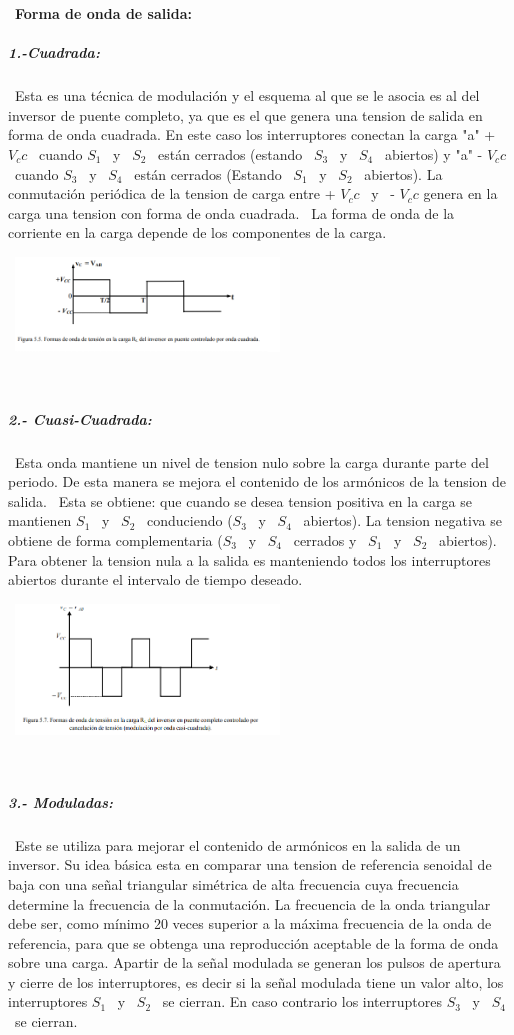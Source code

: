 \documentclass[12pt,letterpaper]{article}
\begin{document}
\
\textbf{Forma de onda de salida:}
\
\subparagraph{1.-Cuadrada:}
\
Esta es una técnica de modulación y el esquema al que se le asocia es al del inversor de puente completo, ya que es el que genera una tension de salida en forma de onda cuadrada.
En este caso los interruptores conectan la carga "a" + $V_cc$ \ cuando $S_1$ \ y \ $S_2$ \ están cerrados (estando \ $S_3$ \ y \ $S_4$ \ abiertos) y "a" - $V_cc$ \ cuando $S_3$ \ y \ $S_4$ \ están cerrados  (Estando \ $S_1$ \ y \ $S_2$ \ abiertos). La conmutación periódica de la tension de carga entre + $V_cc$ \ y \ - $V_cc$ genera en la carga una tension con forma de onda cuadrada.
\
La forma de onda de la corriente en la carga depende de los componentes de la carga.

\
\includegraphics[width=7cm]{Onda cuadrada.png} 

\

\subparagraph{2.- Cuasi-Cuadrada:}
\
Esta onda mantiene un nivel de tension nulo sobre la carga durante parte del periodo. De esta manera se mejora el contenido de los armónicos de la tension de salida.
\
Esta se obtiene: que cuando se desea tension positiva en la carga se mantienen $S_1$ \ y \ $S_2$ \ conduciendo ($S_3$ \ y \ $S_4$ \ abiertos). La tension negativa se obtiene de forma complementaria ($S_3$ \ y \ $S_4$ \ cerrados y \ $S_1$ \ y \ $S_2$ \ abiertos).
Para obtener la tension nula a la salida es manteniendo todos los interruptores abiertos durante el intervalo de tiempo deseado.
\

\
\includegraphics[width=7cm]{Onda Cuasi-Cuadrada.png} 
\

\
\subparagraph{3.- Moduladas:}
\
Este se utiliza para mejorar el contenido de armónicos en la salida de un inversor.
Su idea básica esta en comparar una tension de referencia senoidal de baja  con una señal triangular simétrica de alta frecuencia cuya frecuencia determine la frecuencia de la conmutación.
La frecuencia de la onda triangular debe ser, como mínimo 20 veces superior a la máxima frecuencia de la onda de referencia, para que se obtenga una reproducción aceptable de la forma de onda sobre una carga.
Apartir de la señal modulada se generan los pulsos de apertura y cierre de los interruptores, es decir si la señal modulada tiene un valor alto, los interruptores $S_1$ \ y \ $S_2$ \ se cierran. En caso contrario los interruptores $S_3$ \ y \ $S_4$ \ se cierran.
\
\end{document}
